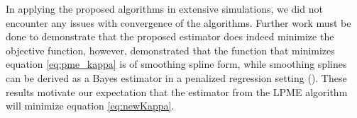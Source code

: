 \documentclass[12pt]{article}
\theoremstyle{definition}
\begin{document}
In applying the proposed algorithms in extensive simulations, we did not encounter any issues with convergence of the algorithms. Further work must be done to demonstrate that the proposed estimator does indeed minimize the objective function, however, \cite{mengPrincipalManifoldEstimation2021} demonstrated that the function that minimizes equation \eqref{eq:pme_kappa} is of smoothing spline form, while smoothing splines can be derived as a Bayes estimator in a penalized regression setting (\cite{wahba1990}). These results motivate our expectation that the estimator from the LPME algorithm will minimize equation \eqref{eq:newKappa}.



\LinesNumbered


\LinesNumbered
\end{document}
